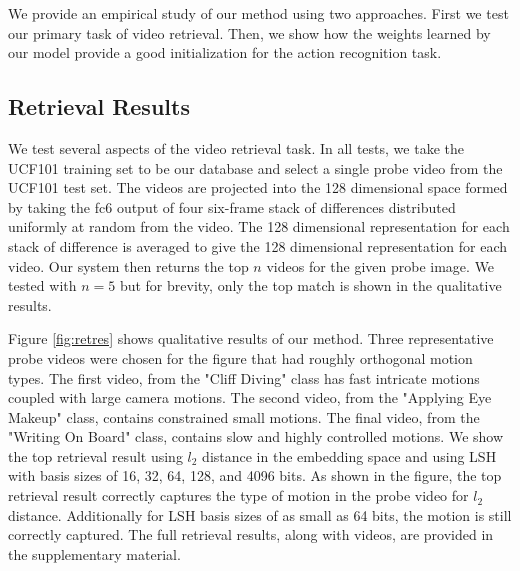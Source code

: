 We provide an empirical study of our method using two approaches. First we test our primary task of video retrieval. Then, we show how the weights learned by our model provide a good initialization for the action recognition task.

\subsection{Retrieval Results}

We test several aspects of the video retrieval task. In all tests, we take the UCF101 \cite{soomro2012ucf101} training set to be our database and select a single probe video from the UCF101 test set. The videos are projected into the 128 dimensional space formed by taking the fc6 output of four six-frame stack of differences distributed uniformly at random from the video. The 128 dimensional representation for each stack of difference is averaged to give the 128 dimensional representation for each video. Our system then returns the top $n$ videos for the given probe image. We tested with $n=5$ but for brevity, only the top match is shown in the qualitative results.

Figure \ref{fig:retres} shows qualitative results of our method. Three representative probe videos were chosen for the figure that had roughly orthogonal motion types. The first video, from the "Cliff Diving" class has fast intricate motions coupled with large camera motions. The second video, from the "Applying Eye Makeup" class, contains constrained small motions. The final video, from the "Writing On Board" class, contains slow and highly controlled motions. We show the top retrieval result using $l_2$ distance in the embedding space and using LSH with basis sizes of 16, 32, 64, 128, and 4096 bits. As shown in the figure, the top retrieval result correctly captures the type of motion in the probe video for $l_2$ distance. Additionally for LSH basis sizes of as small as 64 bits, the motion is still correctly captured. The full retrieval results, along with videos, are provided in the supplementary material.


